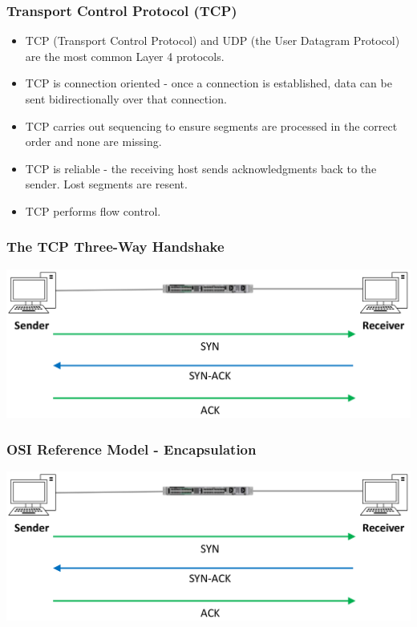\documentclass[pdflatex,compress]{beamer}
\begin{document}
\begin{frame}
	\frametitle{Transport Control Protocol (TCP)}
	\begin{itemize}
		\item TCP (Transport Control Protocol) and UDP (the User Datagram Protocol) are the most common Layer 4 protocols.
		\item TCP is connection oriented - once a connection is established, data can be sent bidirectionally over that connection.
		\item TCP carries out sequencing to ensure segments are processed in the correct order and none are missing.
		\item TCP is reliable - the receiving host sends acknowledgments back to the sender. Lost segments are resent.
		\item TCP performs flow control.
	\end{itemize}
\end{frame}

\begin{frame}
	\frametitle{The TCP Three-Way Handshake}
	\begin{center}
		\includegraphics[width=\linewidth]{img/img03}
	\end{center}
\end{frame}

\begin{frame}
	\frametitle{OSI Reference Model - Encapsulation}
	\begin{center}
		\includegraphics[width=\linewidth]{img/img03}
	\end{center}
\end{frame}
\end{document}

